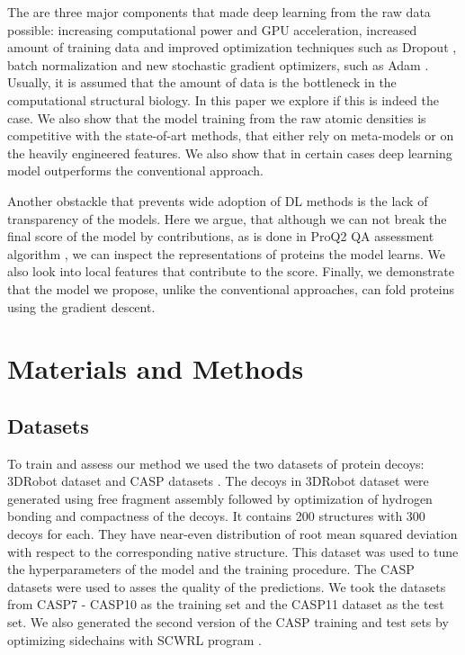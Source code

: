 \documentclass[a4paper,10pt]{article}
\begin{document}
The are three major components that made deep learning from the raw data possible: increasing computational power and GPU acceleration, increased amount of 
training data and improved optimization techniques such as Dropout \cite{}, batch normalization \cite{} and new stochastic gradient optimizers, such as Adam \cite{}.
Usually, it is assumed that the amount of data is the bottleneck in the computational structural biology. In this paper we explore if this is indeed the case. We also show 
that the model training from the raw atomic densities is competitive with the state-of-art methods, that either rely on meta-models or on the heavily engineered features.
We also show that in certain cases deep learning model outperforms the conventional approach.

Another obstackle that prevents wide adoption of DL methods is the lack of transparency of the models. Here we argue, that although we can not break the final score of 
the model by contributions, as is done in ProQ2 QA assessment algorithm \cite{}, we can inspect the representations of proteins the model learns. We also look into local 
features that contribute to the score. Finally, we demonstrate that the model we propose, unlike the conventional approaches, can fold proteins using the gradient descent.

\section{Materials and Methods}
\subsection{Datasets}
To train and assess our method we used the two datasets of protein decoys: 3DRobot dataset \cite{} and CASP datasets \cite{}. The decoys in 3DRobot dataset 
were generated using free fragment assembly followed by optimization of hydrogen bonding and compactness of the decoys. It contains 200 structures with 300 decoys
for each. They have near-even distribution of root mean squared deviation with respect to the corresponding native structure. This dataset was used to tune the 
hyperparameters of the model and the training procedure.
The CASP datasets were used to asses the quality of the predictions. We took the datasets from CASP7 - CASP10 as the training set and the CASP11 dataset as the test set.
We also generated the second version of the CASP training and test sets by optimizing sidechains with SCWRL program \cite{}.
\end{document}
